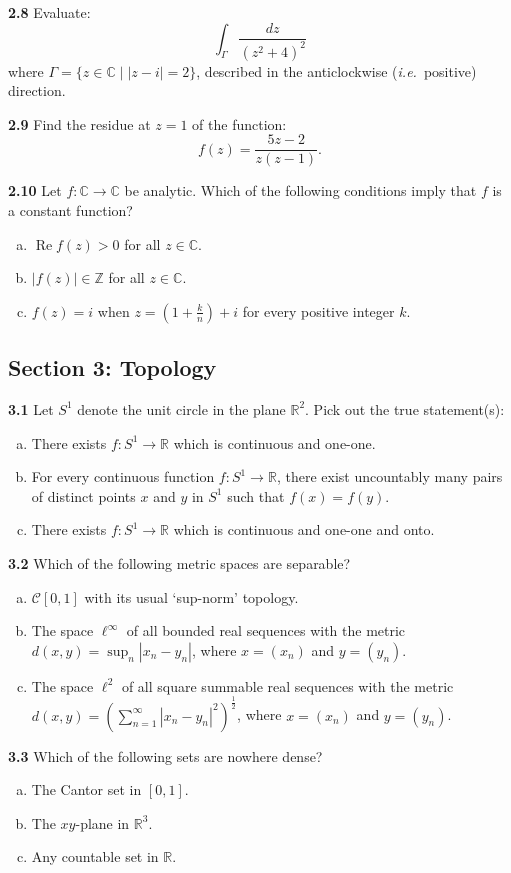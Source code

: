 \documentclass[11pt,a4paper]{article}
\newcommand{\Z}{\mathbb{Z}}
\newcommand{\R}{\mathbb{R}}
\newcommand{\C}{\mathbb{C}}
\newcommand{\RePart}{\operatorname{Re}}
\newcommand{\examsec}[1]{%
  \subsection*{#1}
  \vspace{-2pt}
}
\newcommand{\qitem}[1]{\par\medskip\noindent\textbf{#1}\hspace{0.5em}}
\begin{document}
\qitem{2.8} Evaluate:
\[
  \int_{\Gamma} \frac{dz}{(z^2 + 4)^2}
\]
where $\Gamma = \{z \in \C \mid |z - i| = 2\}$, described in the anticlockwise (\emph{i.e.}\ positive) direction.

\qitem{2.9} Find the residue at $z = 1$ of the function:
\[
  f(z) = \frac{5z - 2}{z(z - 1)}.
\]

\qitem{2.10} Let $f : \C \to \C$ be analytic. Which of the following conditions imply that $f$ is a constant function?
\begin{enumerate}[(a)]
  \item $\RePart f(z) > 0$ for all $z \in \C$.
  \item $|f(z)| \in \Z$ for all $z \in \C$.
  \item $f(z) = i$ when $z = \left(1 + \frac{k}{n}\right) + i$ for every positive integer $k$.
\end{enumerate}

\examsec{Section 3: Topology}

\qitem{3.1} Let $S^1$ denote the unit circle in the plane $\R^2$. Pick out the true statement(s):
\begin{enumerate}[(a)]
  \item There exists $f : S^1 \to \R$ which is continuous and one-one.
  \item For every continuous function $f : S^1 \to \R$, there exist uncountably many pairs of distinct points $x$ and $y$ in $S^1$ such that $f(x) = f(y)$.
  \item There exists $f : S^1 \to \R$ which is continuous and one-one and onto.
\end{enumerate}

\qitem{3.2} Which of the following metric spaces are separable?
\begin{enumerate}[(a)]
  \item $\mathcal{C}[0, 1]$ with its usual `sup-norm' topology.
  \item The space $\ell^\infty$ of all bounded real sequences with the metric $d(x, y) = \sup_n |x_n - y_n|$, where $x = (x_n)$ and $y = (y_n)$.
  \item The space $\ell^2$ of all square summable real sequences with the metric $d(x, y) = \left(\sum_{n=1}^{\infty} |x_n - y_n|^2\right)^{\frac{1}{2}}$, where $x = (x_n)$ and $y = (y_n)$.
\end{enumerate}

\qitem{3.3} Which of the following sets are nowhere dense?
\begin{enumerate}[(a)]
  \item The Cantor set in $[0, 1]$.
  \item The $xy$-plane in $\R^3$.
  \item Any countable set in $\R$.
\end{enumerate}
\end{document}
